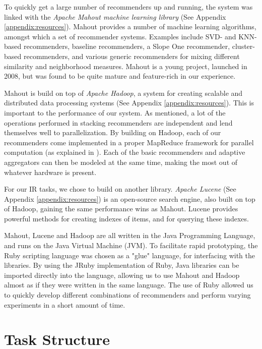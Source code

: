 To quickly get a large number of recommenders up and running,
the system was linked with the \emph{Apache Mahout machine learning library}
(See Appendix \ref{appendix:resources}). 
Mahout provides a number of machine learning
algorithms, amongst which a set of recommender systems.
Examples include SVD- and KNN-based recommenders,
baseline recommenders, a Slope One recommender,
cluster-based recommenders,
and various generic recommenders for mixing different 
similarity and neighborhood measures.
Mahout is a young project, launched in 2008, 
but was found to be quite mature and feature-rich
in our experience.

Mahout is build on top of \emph{Apache Hadoop},
a system for creating scalable and distributed data processing systems 
(See Appendix \ref{appendix:resources}).
This is important to the performance of our system.
As mentioned, a lot of the operations performed in stacking recommenders
are independent and lend themselves well to parallelization.
By building on Hadoop, each of our recommenders come implemented in a 
proper MapReduce framework for parallel computation (as explained in \citet[p75]{Manning2008}).
Each of the basic recommenders and adaptive aggregators can then be modeled at the same time,
making the most out of whatever hardware is present.

For our IR tasks, we chose to build on another library.
\emph{Apache Lucene} (See Appendix \ref{appendix:resources}) is an open-source search engine, also built on top of Hadoop,
gaining the same performance wins as Mahout.
Lucene provides powerful methods for creating indexes of items, and for querying these indexes.

Mahout, Lucene and Hadoop are all written in the Java Programming Language,
and runs on the Java Virtual Machine (JVM).
To facilitate rapid prototyping, the Ruby scripting language was chosen as a "glue" language,
for interfacing with the libraries. 
By using the JRuby implementation of Ruby, Java libraries can be imported directly
into the language, allowing us to use Mahout and Hadoop almost as if they were written in the same language.
The use of Ruby allowed us to quickly develop different combinations of recommenders and
perform varying experiments in a short amount of time.

\section{Task Structure}

